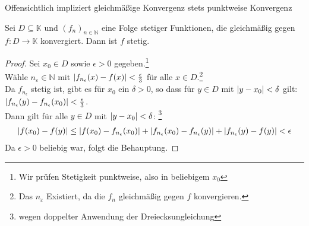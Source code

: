\begin{Bemerkung}{
	Offensichtlich impliziert gleichmäßige Konvergenz stets punktweise Konvergenz
}\end{Bemerkung}

\begin{Satz}{\label{vl_17_satz_2} %
	Sei $D \subseteq \mathbb{K}$ und $(f_n)_{n \in \mathbb{N}}$ eine Folge 
	stetiger Funktionen, die gleichmäßig gegen $f: D \rightarrow \mathbb{K}$ 
	konvergiert. Dann ist $f$ stetig.
}\end{Satz}

\begin{proof}
	Sei $x_0 \in D$ sowie $\epsilon > 0$ gegeben.\footnote{Wir prüfen Stetigkeit punktweise, also in beliebigem $x_0$}\\
	Wähle $n_\varepsilon \in \mathbb{N}$ mit
	$\abs{f_{n_{\epsilon}}(x) -f(x)} < \frac{\epsilon}{3}$
	für alle $x \in D$.\footnote{Das $n_\varepsilon$ Existiert, da die $f_n$ gleichmäßig gegen $f$ konvergieren.}\\
	Da $f_{n_{\epsilon}}$ stetig ist, gibt es für $x_0$ ein $\delta > 0 $, so dass für $y \in D$ mit 
	$\abs{y- x_0} < \delta $ gilt:
	$\abs{f_{n_{\epsilon}}(y) - f_{n_{\epsilon}}(x_0)} < \frac{\epsilon}{3}$.\\
	Dann gilt für alle $y \in D$ mit $\abs{y - x_0} < \delta$: \footnote{wegen doppelter Anwendung der Dreiecksungleichung}
	\begin{align*}
		\abs{f(x_0) -f(y)} \leq \abs{f(x_0) - f_{n_{\epsilon}}(x_0)}
		+ \abs{f_{n_{\epsilon}}(x_0) - f_{n_{\epsilon}}(y)}
		+ \abs{f_{n_{\epsilon}}(y) - f(y)} < \epsilon
	\end{align*}
	Da $\epsilon > 0 $ beliebig war, folgt die Behauptung.
\end{proof}
